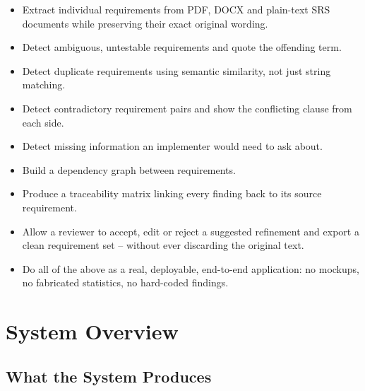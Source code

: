 \documentclass[11pt,a4paper]{article}
\begin{document}
\begin{itemize}[leftmargin=1.4em]
  \item Extract individual requirements from PDF, DOCX and plain-text SRS
        documents while preserving their exact original wording.
  \item Detect ambiguous, untestable requirements and quote the offending
        term.
  \item Detect duplicate requirements using semantic similarity, not just
        string matching.
  \item Detect contradictory requirement pairs and show the conflicting
        clause from each side.
  \item Detect missing information an implementer would need to ask about.
  \item Build a dependency graph between requirements.
  \item Produce a traceability matrix linking every finding back to its
        source requirement.
  \item Allow a reviewer to accept, edit or reject a suggested refinement and
        export a clean requirement set -- without ever discarding the
        original text.
  \item Do all of the above as a real, deployable, end-to-end application:
        no mockups, no fabricated statistics, no hard-coded findings.
\end{itemize}

\section{System Overview}

\subsection{What the System Produces}
\end{document}
